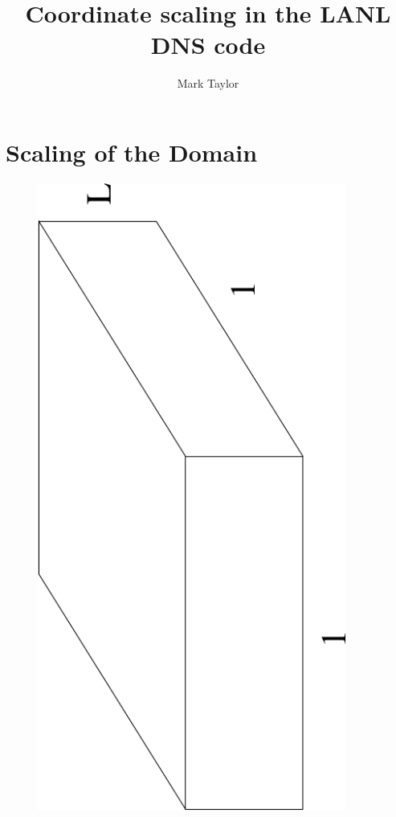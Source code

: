\documentclass[12pt]{article}
\title{Coordinate scaling in the LANL DNS code}
\author{Mark Taylor}
\begin{document}

\section{Scaling of the Domain}
\begin{figure}
\begin{center}
\includegraphics[angle=-90,width=4in]{box}
\caption{ }
\label{F:box}
\end{center}
\end{figure}
\end{document}
